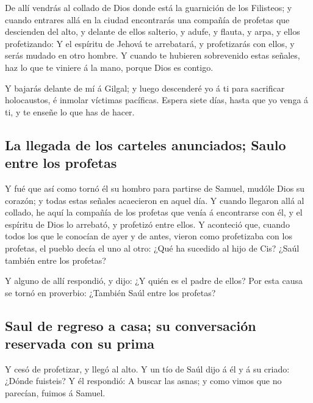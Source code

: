  De allí vendrás al collado de Dios donde está la guarnición
de los Filisteos; y cuando entrares allá en la ciudad encontrarás una
compañía de profetas que descienden del alto, y delante de ellos
salterio, y adufe, y flauta, y arpa, y ellos profetizando: 
Y el espíritu de Jehová te arrebatará, y profetizarás con ellos, y serás
mudado en otro hombre.  Y cuando te hubieren sobrevenido
estas señales, haz lo que te viniere á la mano, porque Dios es contigo.

 Y bajarás delante de mí á Gilgal; y luego descenderé yo á
ti para sacrificar holocaustos, é inmolar víctimas pacíficas. Espera
siete días, hasta que yo venga á ti, y te enseñe lo que has de hacer.

\hypertarget{la-llegada-de-los-carteles-anunciados-saulo-entre-los-profetas}{%
\subsection{La llegada de los carteles anunciados; Saulo entre los
profetas}\label{la-llegada-de-los-carteles-anunciados-saulo-entre-los-profetas}}

 Y fué que así como tornó él su hombro para partirse de
Samuel, mudóle Dios su corazón; y todas estas señales acaecieron en
aquel día.  Y cuando llegaron allá al collado, he aquí la
compañía de los profetas que venía á encontrarse con él, y el espíritu
de Dios lo arrebató, y profetizó entre ellos.  Y aconteció
que, cuando todos los que le conocían de ayer y de antes, vieron como
profetizaba con los profetas, el pueblo decía el uno al otro: ¿Qué ha
sucedido al hijo de Cis? ¿Saúl también entre los profetas?

 Y alguno de allí respondió, y dijo: ¿Y quién es el padre
de ellos? Por esta causa se tornó en proverbio: ¿También Saúl entre los
profetas?

\hypertarget{saul-de-regreso-a-casa-su-conversaciuxf3n-reservada-con-su-prima}{%
\subsection{Saul de regreso a casa; su conversación reservada con su
prima}\label{saul-de-regreso-a-casa-su-conversaciuxf3n-reservada-con-su-prima}}

 Y cesó de profetizar, y llegó al alto.  Y un
tío de Saúl dijo á él y á su criado: ¿Dónde fuisteis? Y él respondió: A
buscar las asnas; y como vimos que no parecían, fuimos á Samuel.

